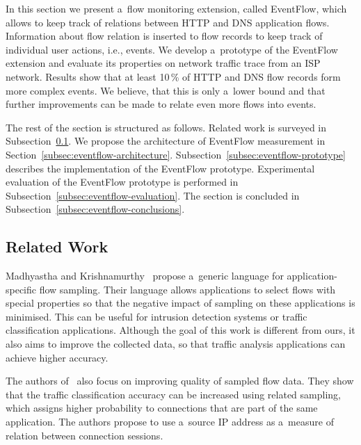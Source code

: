In this section we present a~flow monitoring extension, called EventFlow, which allows to keep track of relations between HTTP and DNS application flows. Information about flow relation is inserted to flow records to keep track of individual user actions, i.e., events. We develop a~prototype of the EventFlow extension and evaluate its properties on network traffic trace from an ISP network. Results show that at least 10\,\% of HTTP and DNS flow records form more complex events. We believe, that this is only a~lower bound and that further improvements can be made to relate even more flows into events.

The rest of the section is structured as follows. Related work is surveyed in Subsection~\ref{subsec:eventflow-related_work}. We propose the architecture of EventFlow measurement in Section~\ref{subsec:eventflow-architecture}. Subsection~\ref{subsec:eventflow-prototype} describes the implementation of the EventFlow prototype. Experimental evaluation of the EventFlow prototype is performed in Subsection~\ref{subsec:eventflow-evaluation}. The section is concluded in Subsection~\ref{subsec:eventflow-conclusions}.


\subsection{Related Work} \label{subsec:eventflow-related_work}

Madhyastha and Krishnamurthy~\cite{Madhyastha-2008-Generic} propose a~generic language for application-specific flow sampling. Their language allows applications to select flows with special properties so that the negative impact of sampling on these applications is minimised. This can be useful for intrusion detection systems or traffic classification applications. Although the goal of this work is different from ours, it also aims to improve the collected data, so that traffic analysis applications can achieve higher accuracy.

The authors of~\cite{Lee-2015-Flow} also focus on improving quality of sampled flow data. They show that the traffic classification accuracy can be increased using related sampling, which assigns higher probability to connections that are part of the same application. The authors propose to use a~source IP address as a~measure of relation between connection sessions.

